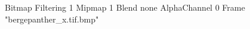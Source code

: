 {Bitmap
	{Filtering 1}
	{Mipmap 1}
	{Blend none}
	{AlphaChannel 0}
	{Frame "bergepanther_x.tif.bmp"}
}
